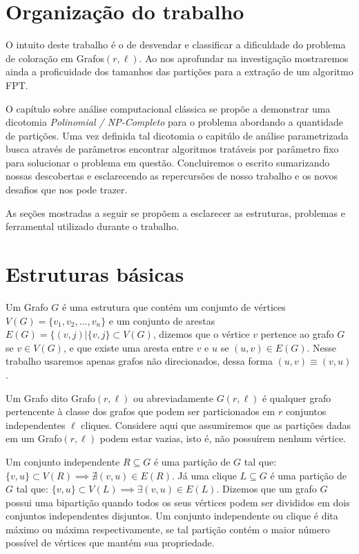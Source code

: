 \section{Organização do trabalho}
O intuito deste trabalho é o de desvendar e classificar a dificuldade do problema de coloração em Grafos$(r,\ell)$. Ao nos aprofundar na investigação mostraremos ainda a proficuidade dos tamanhos das partições para a extração de um algoritmo FPT. 

O capítulo sobre análise computacional clássica se propõe a demonstrar uma dicotomia \emph{Polinomial / NP-Completo} para o problema abordando a quantidade de partições. Uma vez definida tal dicotomia o capitúlo de análise parametrizada busca através de parâmetros encontrar algoritmos tratáveis por parâmetro fixo para solucionar o problema em questão. Concluiremos o escrito sumarizando nossas descobertas e esclarecendo as repercursões de nosso trabalho e os novos desafios que nos pode trazer.

As seções mostradas a seguir se propõem a esclarecer as estruturas, problemas e ferramental utilizado durante o trabalho.

\section{Estruturas básicas}

 Um Grafo $G$ é uma estrutura que contém um conjunto de vértices $V(G) = \{v_1,v_2,...,v_n\}$ e um conjunto de arestas $E(G)=\{(v,j) | \{v,j\} \subset V(G)$, dizemos que o vértice $v$ pertence ao grafo $G$ se $v \in V(G)$, e que existe uma aresta entre $v$ e $u$ se $(u,v) \in E(G)$. Nesse trabalho usaremos apenas grafos não direcionados, dessa forma $(u,v) \equiv (v,u)$. 
 
 Um Grafo dito Grafo$(r,\ell)$ ou abreviadamente $G(r,\ell)$ é qualquer grafo pertencente à classe dos grafos que podem ser particionados em $r$ conjuntos independentes $\ell$ cliques. Considere aqui que assumiremos que as partições dadas em um Grafo$(r,\ell)$ podem estar vazias, isto é, não possuírem nenhum vértice. 

Um conjunto independente $R \subseteq G$ é uma partição de $G$ tal que: $ \{v,u\} \subset V(R) \implies \nexists (v,u) \in E(R)$. Já uma clique $L \subseteq G$ é uma partição de $G$ tal que: $ \{v,u\} \subset V(L) \implies \exists (v,u) \in E(L)$. Dizemos que um grafo $G$ possui uma bipartição quando todos os seus vértices podem ser divididos em dois conjuntos independentes disjuntos. Um conjunto independente ou clique é dita máximo ou máxima respectivamente, se tal partição contém o maior número possível de vértices que mantém sua propriedade.

